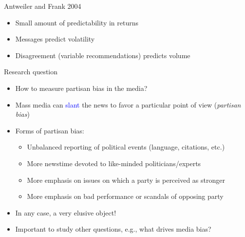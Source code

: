 \documentclass[english]{beamer}
\begin{document}

\begin{frame}{Antweiler and Frank 2004}
\begin{itemize}
\setlength{\itemsep}{1em}
    \item Small amount of predictability in returns
    \item Messages predict volatility
    \item Disagreement (variable recommendations) predicts volume
\end{itemize}
\end{frame}

\begin{frame}{Research question}
\begin{itemize}
\setlength{\itemsep}{0.85em}
\item How to measure partisan bias in the media?

\pause

\item{Mass media can \textcolor{blue}{slant} the news to favor a particular point of view (\textit{partisan bias})}

\pause

\item{Forms of partisan bias:


\vspace{7pt}

\begin{itemize}
\setlength{\itemindent}{-1em}
\setlength{\itemsep}{0.4em}
\item{Unbalanced reporting of political events (language, citations, etc.)}
\vspace*{4pt}
\item{More newstime devoted to like-minded politicians/experts}
\vspace*{4pt}
\item{More emphasis on issues on which a party is perceived as stronger}
\vspace*{4pt}
\item{More emphasis on bad performance or scandals of opposing party}
\end{itemize}}

\item In any case, a very elusive object!

\pause

\item Important to study other questions, e.g., what drives media bias?

\end{itemize}

\end{frame}
\end{document}
